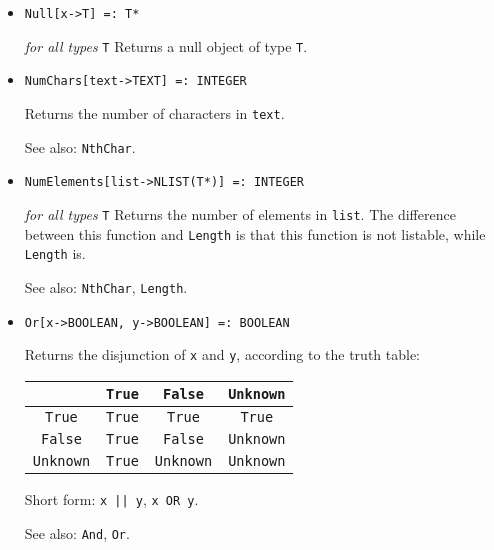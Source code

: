 \begin{itemize}
\item{}
\protect \large \begin{verbatim}
Null[x->T] =: T*
\end{verbatim}\normalsize

{\it for all types} {\tt T}
\bd
Returns a null object of type \verb+T+.  
\ed

\item{}
\protect \large \begin{verbatim}
NumChars[text->TEXT] =: INTEGER 
\end{verbatim}\normalsize

\bd
Returns the number of characters in \verb+text+.
\item [See also:] \verb+NthChar+.
\ed

\item{}
\protect \large \begin{verbatim}
NumElements[list->NLIST(T*)] =: INTEGER 
\end{verbatim}\normalsize

{\it for all types} {\tt T}
\bd
Returns the number of elements in \verb+list+.  The difference between
this function and \verb+Length+ is that this function is not listable,
while \verb+Length+ is.  
\item
[See also:] \verb+NthChar+, \verb+Length+.
\ed





\item{} 
\protect \large \begin{verbatim}
Or[x->BOOLEAN, y->BOOLEAN] =: BOOLEAN 
\end{verbatim} \normalsize
  
\bd
Returns the disjunction of \verb+x+ and \verb+y+, according to the truth
table:
\begin{center}
\begin{tabular} {|c||c|c|c|} \hline
& \verb+True+ & \verb+False+ & \verb+Unknown+ \\ \hline 
\verb+True+ & \verb+True+ & \verb+True+ & \verb+True+ \\
\verb+False+ & \verb+True+ & \verb+False+ & \verb+Unknown+ \\
\verb+Unknown+ & \verb+True+ & \verb+Unknown+ & \verb+Unknown+ \\ \hline
\end{tabular}
\end{center}
\item
[Short form:] \verb+x || y+, \verb+x OR y+.
\item [See also:] \verb+And+, \verb+Or+.
\ed


\end{itemize}
